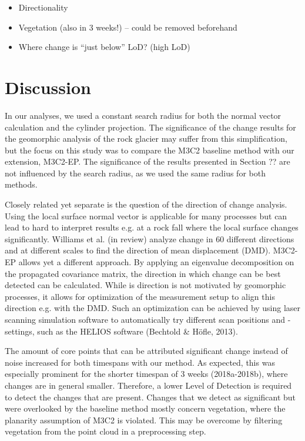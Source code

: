 \documentclass[preprint,12pt,3p]{elsarticle}
\begin{document}
 \begin{itemize}
    \item Directionality
    \item Vegetation (also in 3 weeks!) – could be removed beforehand
    \item Where change is “just below” LoD? (high LoD)
 \end{itemize}

\section{Discussion}
In our analyses, we used a constant search radius for both the normal vector calculation and the cylinder projection. The significance of the change results for the geomorphic analysis of the rock glacier may suffer from this simplification, but the focus on this study was to compare the M3C2 baseline method with our extension, M3C2-EP. The significance of the results presented in Section ?? are not influenced by the search radius, as we used the same radius for both methods. 

Closely related yet separate is the question of the direction of change analysis. Using the local surface normal vector is applicable for many processes but can lead to hard to interpret results e.g. at a rock fall where the local surface changes significantly. Williams et al. (in review) analyze change in 60 different directions and at different scales to find the direction of mean displacement (DMD). M3C2-EP allows yet a different approach. By applying an eigenvalue decomposition on the propagated covariance matrix, the direction in which change can be best detected can be calculated. While is direction is not motivated by geomorphic processes, it allows for optimization of the measurement setup to align this direction e.g. with the DMD. Such an optimization can be achieved by using laser scanning simulation software to automatically try different scan positions and -settings, such as the HELIOS software (Bechtold & Höfle, 2013).

The amount of core points that can be attributed significant change instead of noise increased for both timespans with our method. As expected, this was especially prominent for the shorter timespan of 3 weeks (2018a-2018b), where changes are in general smaller. Therefore, a lower Level of Detection is required to detect the changes that are present. 
Changes that we detect as significant but were overlooked by the baseline method mostly concern vegetation, where the planarity assumption of M3C2 is violated. This may be overcome by filtering vegetation from the point cloud in a preprocessing step.
\end{document}
